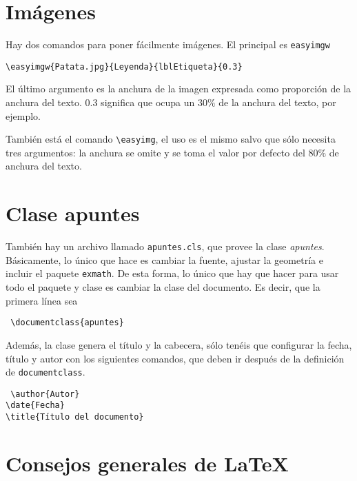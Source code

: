 \documentclass[nochap]{apuntes}
\begin{document}
\section{Imágenes}

Hay dos comandos para poner fácilmente imágenes. El principal es \texttt{easyimgw}

\begin{verbatim}
\easyimgw{Patata.jpg}{Leyenda}{lblEtiqueta}{0.3}
\end{verbatim}

El último argumento es la anchura de la imagen expresada como proporción de la anchura del texto. $0.3$ significa que ocupa un $30\%$ de la anchura del texto, por ejemplo.


También está el comando \verb|\easyimg|, el uso es el mismo salvo que sólo necesita tres argumentos: la anchura se omite y se toma el valor por defecto del $80\%$ de anchura del texto. 
 
 \section{Clase apuntes}
 
 También hay un archivo llamado \texttt{apuntes.cls}, que provee la clase \textit{apuntes}. Básicamente, lo único que hace es cambiar la fuente, ajustar la geometría e incluir el paquete \texttt{exmath}. De esta forma, lo único que hay que hacer para usar todo el paquete y clase es cambiar la clase del documento. Es decir, que la primera línea sea 
 
 \begin{verbatim}
 \documentclass{apuntes}
 \end{verbatim}
 
 Además, la clase genera el título y la cabecera, sólo tenéis que configurar la fecha, título y autor con los siguientes comandos, que deben ir después de la definición de \texttt{documentclass}.
 
 \begin{verbatim}
 \author{Autor}
\date{Fecha}
\title{Título del documento}
 \end{verbatim}
 
\section{Consejos generales de \LaTeX}
\end{document}
